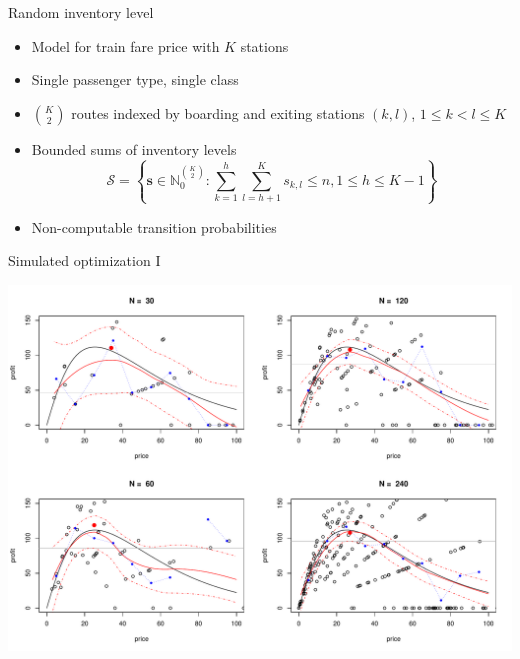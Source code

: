 \documentclass[10pt]{beamer}
\begin{document}
\begin{frame}[fragile]{Random inventory level}
  
	\begin{itemize}
		\item Model for train fare price with $K$ stations
		\item Single passenger type, single class
		\item $\binom{K}{2}$ routes indexed by boarding and exiting stations $(k,l)$, $1 \leq k < l \leq K$
		\item Bounded sums of inventory levels
			\[
				\mathcal{S} = \left\{ \bm{s} \in \mathbb{N}_0^{\binom{K}{2}}: \sum_{k=1}^h \sum_{l=h+1}^K s_{k,l} \leq n, 1 \leq h \leq K-1 \right\}
			\]
		\item Non-computable transition probabilities
	\end{itemize}

\end{frame}

\begin{frame}[fragile]{Simulated optimization I}

  \begin{center}
		\includegraphics[width=\textwidth]{figures/newsboy_old.pdf}
	\end{center}
	
\end{frame}
\end{document}
